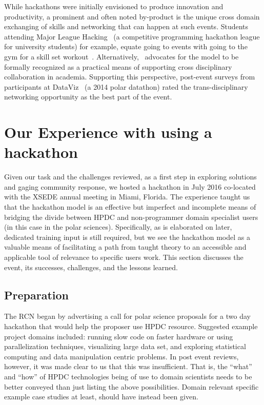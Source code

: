 \documentclass[conference]{IEEEtran}
\begin{document}
While hackathons were initially envisioned to produce innovation and productivity, a prominent and often noted by-product is the unique cross domain exchanging of skills and networking that can happen at such events. Students attending Major League Hacking~\cite{noauthor_undated-tz} (a competitive programming hackathon league for university students) for example, equate going to events with going to the gym for a skill set workout~\cite{Leckart2015-go}.  Alternatively,~\cite{Aboab2016-tk} advocates for the model to be formally recognized as a practical means of supporting cross disciplinary collaboration in academia. Supporting this perspective, post-event surveys from participants at DataViz~\cite{mattmann2015} (a 2014 polar datathon) rated the trans-disciplinary networking opportunity as the best part of the event.

\section{Our Experience with using a hackathon}
Given our task and the challenges reviewed, as a first step in exploring solutions and gaging community response, we hosted a hackathon in July 2016 co-located with the XSEDE annual meeting in Miami, Florida. The experience taught us that the hackathon model is an effective but imperfect and incomplete means of bridging the divide between HPDC and non-programmer domain specialist users (in this case in the polar sciences).  Specifically, as is elaborated on later, dedicated training input is still required, but we see the hackathon model as a valuable means of facilitating a path from taught theory to an accessible and applicable tool of relevance to specific users work. This section discusses the event, its successes, challenges, and the lessons learned.

\subsection{Preparation}
The RCN began by advertising a call for polar science proposals for a two day hackathon that would help the proposer use HPDC resource.  Suggested example project domains included: running slow code on faster hardware or using parallelization techniques, visualizing large data set, and exploring statistical computing and data manipulation centric problems.  In post event reviews, however, it was made clear to us that this was insufficient. That is, the ``what'' and ``how'' of HPDC technologies being of use to domain scientists needs to be better conveyed than just listing the above possibilities.  Domain relevant specific example case studies at least, should have instead been given.
\end{document}
